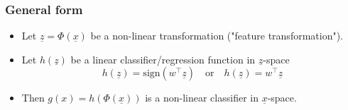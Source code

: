     \subsubsection{General form}
    \begin{definition}
        \begin{itemize}
            \item Let \( \underline{z} = \Phi(\underline{x}) \) be a non-linear transformation ("feature transformation").
            
            \item Let \( h(\underline{z}) \) be a linear classifier/regression function in \( \underline{z} \)-space 
            \[
            h(\underline{z}) = \text{sign}(w^\top \underline{z}) \quad \text{or} \quad h(\underline{z}) = w^\top \underline{z}
            \]
            
            \item Then \( g(x) = h(\Phi(\underline{x})) \) is a non-linear classifier in \( \underline{x} \)-space.
            
        \end{itemize}
    \end{definition}

